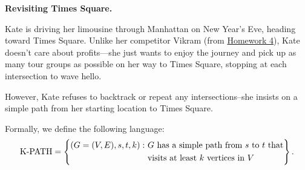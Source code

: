 \documentclass[11pt,addpoints,answers]{exam}
\begin{document}
\begin{questions}

\pagebreak
\question \textbf{Revisiting Times Square.}
\newcommand{\KPATH}{\cproblem{K-PATH}}
\newcommand{\Lhalt}{LHALT}

Kate is driving her limousine through Manhattan on New Year's Eve, heading toward Times Square. Unlike her competitor Vikram (from \href{https://drive.google.com/drive/folders/1x1m30KNMTHtQIA8QOCnfUH6lxWMcFtvj?usp=drive_link}{Homework 4}), Kate doesn't care about profits—she just wants to enjoy the journey and pick up as many tour groups as possible on her way to Times Square, stopping at each intersection to wave hello.

However, Kate refuses to backtrack or repeat any intersections--she insists on a simple path from her starting location to Times Square.

Formally, we define the following language:
\[
    \KPATH = \left\{
\begin{aligned}
(G=(V,E),s,t,k) :~ &\text{$G$ has a simple path from $s$ to $t$ that}\\
&\text{visits at least $k$ vertices in $V$}
\end{aligned}
\right\}.
\]

\end{questions}
\end{document}
